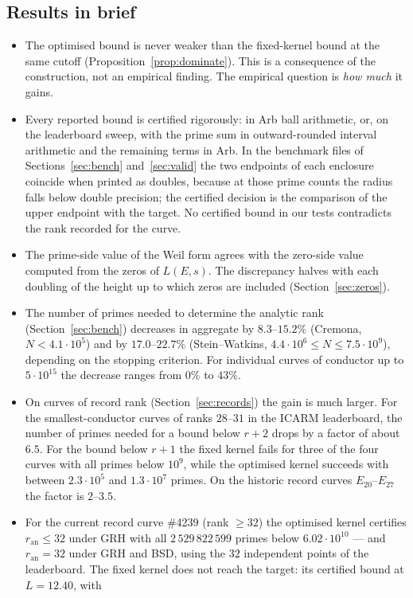 \documentclass[11pt]{amsart}
\theoremstyle{remark}
\theoremstyle{definition}
\newcommand{\ran}{r_{\mathrm{an}}}
\begin{document}
\subsection*{Results in brief}
\begin{itemize}
\item The optimised bound is never weaker than the fixed-kernel bound at the same cutoff (Proposition~\ref{prop:dominate}). This is a consequence of the construction, not an empirical finding. The empirical question is \emph{how much} it gains.
\item Every reported bound is certified rigorously: in Arb ball arithmetic, or, on the leaderboard
sweep, with the prime sum in outward-rounded interval arithmetic and the remaining terms in Arb. In
the benchmark files of Sections~\ref{sec:bench} and~\ref{sec:valid} the two endpoints of each
enclosure coincide when printed as doubles, because at those prime counts the radius falls below
double precision; the certified decision is the comparison of the upper endpoint with the target. No certified bound in our tests contradicts the rank recorded for the curve.
\item The prime-side value of the Weil form agrees with the zero-side value computed from the zeros of $L(E,s)$. The discrepancy halves with each doubling of the height up to which zeros are included (Section~\ref{sec:zeros}).
\item The number of primes needed to determine the analytic rank (Section~\ref{sec:bench}) decreases in aggregate by $8.3$--$15.2\%$ (Cremona, $N<4.1\cdot 10^5$) and by $17.0$--$22.7\%$ (Stein--Watkins, $4.4\cdot10^6\le N\le 7.5\cdot 10^9$), depending on the stopping criterion. For individual curves of conductor up to $5\cdot 10^{15}$ the decrease ranges from $0\%$ to $43\%$.
\item On curves of record rank (Section~\ref{sec:records}) the gain is much larger. For the smallest-conductor curves of ranks $28$--$31$ in the ICARM leaderboard, the number of primes needed for a bound below $r+2$ drops by a factor of about $6.5$. For the bound below $r+1$ the fixed kernel fails for three of the four curves with all primes below $10^9$, while the optimised kernel succeeds with between $2.3\cdot10^5$ and $1.3\cdot10^7$ primes. On the historic record curves $E_{20}$--$E_{27}$ the factor is $2$--$3.5$.
\item For the current record curve \#4239 (rank $\ge32$) the optimised kernel certifies $\ran\le32$ under GRH with all $2\,529\,822\,599$ primes below $6.02\cdot10^{10}$ --- and $\ran=32$ under GRH and BSD, using the $32$ independent points of the leaderboard. The fixed kernel does not reach the target: its certified bound at $L=12.40$, with

\end{itemize}
\end{document}
